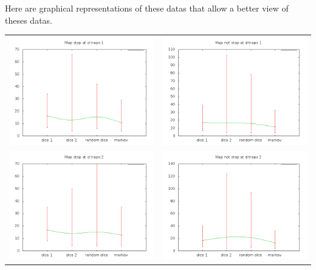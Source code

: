 \documentclass{eplDoc}
\begin{document}
Here are graphical representations of these datas that allow a better view of theses datas.
\begin{center}
    \begin{tabular}{cc}
            \includegraphics[width=9cm]{../map1.png}&
            \includegraphics[width=9cm]{../map2.png}\\
            \includegraphics[width=9cm]{../map4.png}&
            \includegraphics[width=9cm]{../map5.png}\\

\end{tabular}
\end{center}
\end{document}
